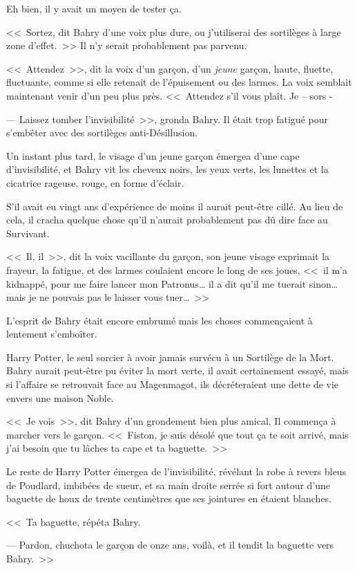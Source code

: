 Eh bien, il y avait un moyen de tester ça.

<<~Sortez, dit Bahry d'une voix plus dure, ou j'utiliserai des sortilèges à large zone d'effet.~>> Il n'y serait probablement pas parvenu.

<<~Attendez~>>, dit la voix d'un garçon, d'un \emph{jeune} garçon, haute, fluette, fluctuante, comme si elle retenait de l'épuisement ou des larmes. La voix semblait maintenant venir d'un peu plus près. <<~Attendez s'il vous plaît. Je -- sors -

--- Laissez tomber l'invisibilité~>>, gronda Bahry. Il était trop fatigué pour s'embêter avec des sortilèges anti-Désillusion.

Un instant plus tard, le visage d'un jeune garçon émergea d'une cape d'invisibilité, et Bahry vit les cheveux noirs, les yeux verts, les lunettes et la cicatrice rageuse, rouge, en forme d'éclair.

S'il avait eu vingt ans d'expérience de moins il aurait peut-être cillé. Au lieu de cela, il cracha quelque chose qu'il n'aurait probablement pas dû dire face au Survivant.

<<~Il, il~>>, dit la voix vacillante du garçon, son jeune visage exprimait la frayeur, la fatigue, et des larmes coulaient encore le long de ses joues, <<~il m'a kidnappé, pour me faire lancer mon Patronus… il a dit qu'il me tuerait sinon… mais je ne pouvais pas le laisser vous tuer…~>>

L'esprit de Bahry était encore embrumé mais les choses commençaient à lentement s'emboîter.

Harry Potter, le seul sorcier à avoir jamais survécu à un Sortilège de la Mort. Bahry aurait peut-être pu éviter la mort verte, il avait certainement essayé, mais si l'affaire se retrouvait face au Magenmagot, ils décréteraient une dette de vie envers une maison Noble.

<<~Je vois~>>, dit Bahry d'un grondement bien plus amical. Il commença à marcher vers le garçon. <<~Fiston, je suis désolé que tout ça te soit arrivé, mais j'ai besoin que tu lâches ta cape et ta baguette.~>>

Le reste de Harry Potter émergea de l'invisibilité, révélant la robe à revers bleus de Poudlard, imbibées de sueur, et sa main droite serrée si fort autour d'une baguette de houx de trente centimètres que ses jointures en étaient blanches.

<<~Ta baguette, répéta Bahry.

--- Pardon, chuchota le garçon de onze ans, voilà, et il tendit la baguette vers Bahry.~>>

